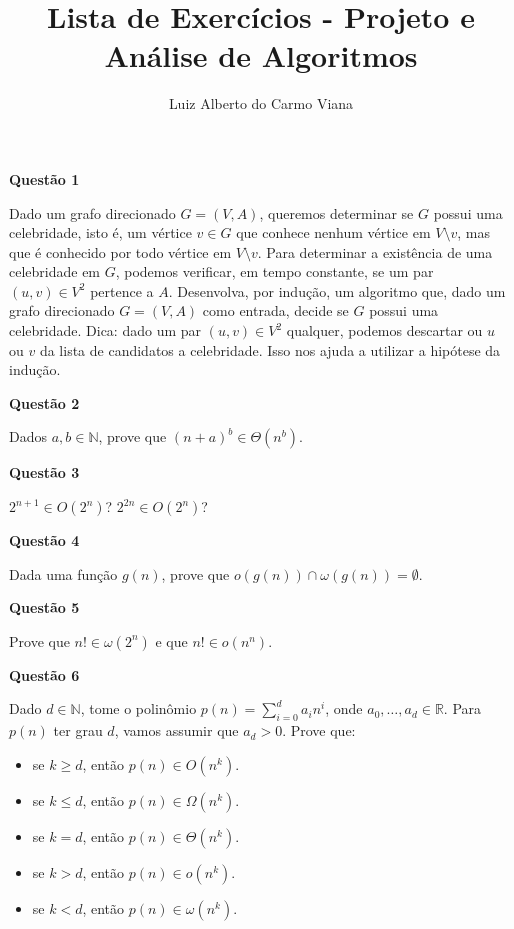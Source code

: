\documentclass[]{article}
\title{Lista de Exercícios - Projeto e Análise de Algoritmos}
\author{Luiz Alberto do Carmo Viana}
\begin{document}
\maketitle

\vspace{\baselineskip}

\textbf{Questão 1}

Dado um grafo direcionado $G = (V, A)$, queremos determinar se $G$ possui uma celebridade, isto é, um vértice $v \in G$ que conhece nenhum vértice em $V \setminus v$, mas que é conhecido por todo vértice em $V \setminus v$.
Para determinar a existência de uma celebridade em $G$, podemos verificar, em tempo constante, se um par $(u, v) \in V^2$ pertence a $A$.
Desenvolva, por indução, um algoritmo que, dado um grafo direcionado $G = (V, A)$ como entrada, decide se $G$ possui uma celebridade.
Dica: dado um par $(u, v) \in V^2$ qualquer, podemos descartar ou $u$ ou $v$ da lista de candidatos a celebridade.
Isso nos ajuda a utilizar a hipótese da indução.

\vspace{\baselineskip}

\textbf{Questão 2}

Dados $a, b \in \mathbb{N}$, prove que $(n + a)^b \in \Theta(n^b)$.

\vspace{\baselineskip}

\textbf{Questão 3}

$2^{n + 1} \in O(2^n)$? $2^{2n} \in O(2^n)$?

\vspace{\baselineskip}

\textbf{Questão 4}

Dada uma função $g(n)$, prove que $o(g(n)) \cap \omega(g(n)) = \emptyset$.

\vspace{\baselineskip}

\textbf{Questão 5}

Prove que $n! \in \omega(2^n)$ e que $n! \in o(n^n)$.

\vspace{\baselineskip}

\textbf{Questão 6}

Dado $d \in \mathbb{N}$, tome o polinômio $p(n) = \sum_{i = 0}^d a_in^i$, onde $a_0, \dots, a_d \in \mathbb{R}$.
Para $p(n)$ ter grau $d$, vamos assumir que $a_d > 0$.
Prove que:
\begin{itemize}
  \item se $k \geq d$, então $p(n) \in O(n^k)$.
  \item se $k \leq d$, então $p(n) \in \Omega(n^k)$.
  \item se $k = d$, então $p(n) \in \Theta(n^k)$.
  \item se $k > d$, então $p(n) \in o(n^k)$.
  \item se $k < d$, então $p(n) \in \omega(n^k)$.
\end{itemize}
\end{document}
